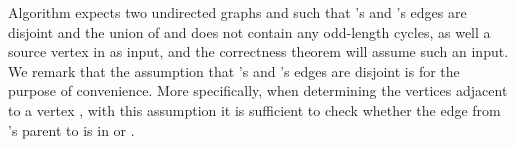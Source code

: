 \begin{isabellebody}
\isanewline
{}\isamarkupfalse%
%
\isadelimdocument
%
\endisadelimdocument
%
\isatagdocument
%
\isamarkuptrue%
%
\isamarkuptrue%
%
\endisatagdocument
{\isafolddocument}%
%
\isadelimdocument
%
\endisadelimdocument
%
\begin{isamarkuptext}%
Algorithm  expects two undirected graphs  and  such that
's and 's edges are disjoint and the union of  and  does not
contain any odd-length cycles, as well a source vertex  in  as input, and the
correctness theorem will assume such an input. We remark that the assumption that 's and
's edges are disjoint is for the purpose of convenience. More specifically, when
determining the vertices adjacent to a vertex , with this assumption it is sufficient to
check whether the edge from 's parent to  is in  or .



\end{isamarkuptext}
\end{isabellebody}
